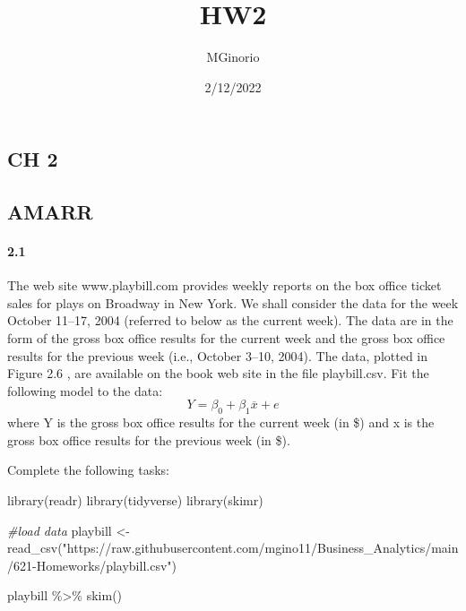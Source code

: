 \documentclass[
]{article}
\title{HW2}
\author{MGinorio}
\date{2/12/2022}
\newenvironment{Shaded}{\begin{snugshade}}{\end{snugshade}}
\newcommand{\CommentTok}[1]{\textcolor[rgb]{0.56,0.35,0.01}{\textit{#1}}}
\newcommand{\FunctionTok}[1]{\textcolor[rgb]{0.00,0.00,0.00}{#1}}
\newcommand{\NormalTok}[1]{#1}
\newcommand{\OtherTok}[1]{\textcolor[rgb]{0.56,0.35,0.01}{#1}}
\newcommand{\SpecialCharTok}[1]{\textcolor[rgb]{0.00,0.00,0.00}{#1}}
\newcommand{\StringTok}[1]{\textcolor[rgb]{0.31,0.60,0.02}{#1}}
\begin{document}
\maketitle

\hypertarget{ch-2}{%
\subsection{CH 2}\label{ch-2}}

\hypertarget{amarr}{%
\subsection{AMARR}\label{amarr}}

\hypertarget{section}{%
\paragraph{2.1}\label{section}}

The web site www.playbill.com provides weekly reports on the box office
ticket sales for plays on Broadway in New York. We shall consider the
data for the week October 11--17, 2004 (referred to below as the current
week). The data are in the form of the gross box office results for the
current week and the gross box office results for the previous week
(i.e., October 3--10, 2004). The data, plotted in Figure 2.6 , are
available on the book web site in the file playbill.csv. Fit the
following model to the data:
\[ Y =  \beta_{0}+ \beta_1 \overline{x} + e\]where Y is the gross box
office results for the current week (in \$) and x is the gross box
office results for the previous week (in \$).

Complete the following tasks:

\begin{Shaded}
\begin{Highlighting}[]
\FunctionTok{library}\NormalTok{(readr)}
\FunctionTok{library}\NormalTok{(tidyverse)}
\FunctionTok{library}\NormalTok{(skimr)}

\CommentTok{\#load data}
\NormalTok{playbill }\OtherTok{\textless{}{-}} \FunctionTok{read\_csv}\NormalTok{(}\StringTok{"https://raw.githubusercontent.com/mgino11/Business\_Analytics/main/621{-}Homeworks/playbill.csv"}\NormalTok{)}

\NormalTok{playbill }\SpecialCharTok{\%\textgreater{}\%} \FunctionTok{skim}\NormalTok{()}
\end{Highlighting}
\end{Shaded}
\end{document}
